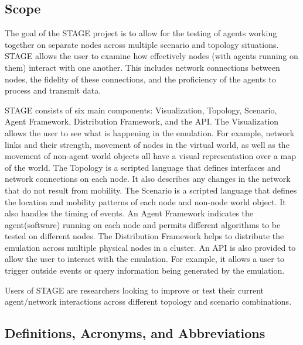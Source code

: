 \documentclass[titlepage]{article}
\begin{document}

\subsection{Scope%
  \label{scope}%
}

The goal of the STAGE project is to allow for the testing of agents working together on separate nodes across multiple scenario and topology situations.  STAGE allows the user to examine how effectively nodes (with agents running on them) interact with one another.  This includes network connections between nodes, the fidelity of these connections, and the proficiency of the agents to process and transmit data.

STAGE consists of six main components: Visualization, Topology, Scenario, Agent Framework, Distribution Framework, and the API.  The Visualization allows the user to see what is happening in the emulation.  For example, network links and their strength, movement of nodes in the virtual world, as well as the movement of non-agent world objects all have a visual representation over a map of the world.  The Topology is a scripted language that defines interfaces and network connections on each node.  It also describes any changes in the network that do not result from mobility.  The Scenario is a scripted language that defines the location and mobility patterns of each node and non-node world object. It also handles the timing of events. An Agent Framework indicates the agent(software) running on each node and permits different algorithms to be tested on different nodes.  The Distribution Framework helps to distribute the emulation across multiple physical nodes in a cluster.  An API is also provided to allow the user to interact with the emulation.  For example, it allows a user to trigger outside events or query information being generated by the emulation. 

Users of STAGE are researchers looking to improve or test their current agent/network interactions across different topology and scenario combinations.  

\subsection{Definitions, Acronyms, and Abbreviations%
  \label{definitions}%
}
\end{document}
